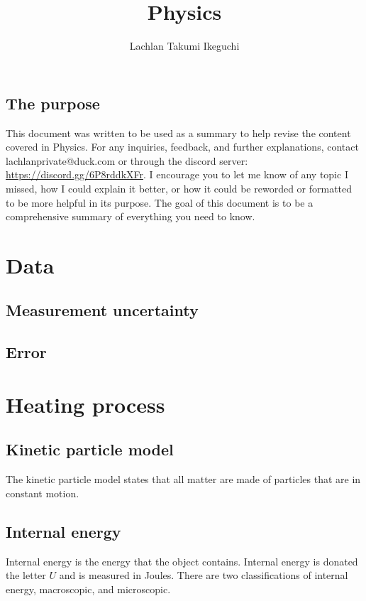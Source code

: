 \documentclass{book}
\title{Physics}
\author{Lachlan Takumi Ikeguchi}
\newenvironment{generalInformation}{}{}
\begin{document}
\maketitle
\tableofcontents

\section{The purpose}
This document was written to be used as a summary to help revise the content covered in Physics.  For any inquiries, feedback, and further explanations, contact lachlanprivate@duck.com or through the discord server: \url{https://discord.gg/6P8rddkXFr}.  I encourage you to let me know of any topic I missed, how I could explain it better, or how it could be reworded or formatted to be more helpful in its purpose.  The goal of this document is to be a comprehensive summary of everything you need to know.



\chapter{Data}
\section{Measurement uncertainty}

\section{Error}



\chapter{Heating process}
\section{Kinetic particle model}
\begin{generalInformation}
    The kinetic particle model states that all matter are made of particles that are in constant motion.
\end{generalInformation}


\section{Internal energy}
\begin{generalInformation}
    Internal energy is the energy that the object contains.  Internal energy is donated the letter $U$ and is measured in Joules.  There are two classifications of internal energy, macroscopic, and microscopic.
\end{generalInformation}
\end{document}
